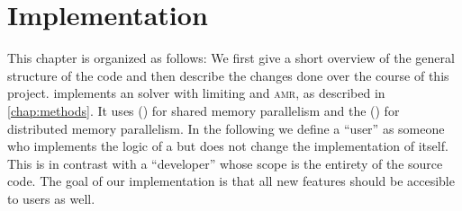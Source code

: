 \chapter{Implementation}\label{chap:implementation}
This chapter is organized as follows:
We first give a short overview of the general structure of the \exahype{} code and then describe the changes done over the course of this project.
\exahype{} implements an \aderdg{} solver with \muscl{} limiting and \textsc{amr}, as described in \cref{chap:methods}.
It uses  (\tbb{}) for shared memory parallelism and the  (\mpi{}) for distributed memory parallelism. 
In the following we define a \enquote{user} as someone who implements the logic of a \pde{} but does not change the implementation of \exahype{} itself.
This is in contrast with a \enquote{developer} whose scope is the entirety of the source code.
The goal of our implementation is that all new features should be accesible to users as well.

